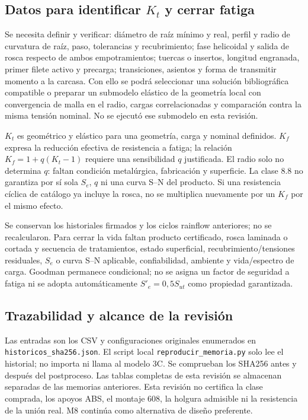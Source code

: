 \subsection{Datos para identificar $K_t$ y cerrar fatiga}
Se necesita definir y verificar: diámetro de raíz mínimo y real, perfil
y radio de curvatura de raíz, paso, tolerancias y recubrimiento; fase
helicoidal y salida de rosca respecto de ambos empotramientos; tuercas o
insertos, longitud engranada, primer filete activo y precarga; transiciones,
asientos y forma de transmitir momento a la carcasa. Con ello se podrá
seleccionar una solución bibliográfica compatible o preparar un submodelo
elástico de la geometría local con convergencia de malla en el radio,
cargas correlacionadas y comparación contra la misma tensión nominal.
No se ejecutó ese submodelo en esta revisión.

$K_t$ es geométrico y elástico para una geometría, carga y nominal
definidos. $K_f$ expresa la reducción efectiva de resistencia a fatiga;
la relación $K_f=1+q(K_t-1)$ requiere una sensibilidad $q$ justificada.
El radio solo no determina $q$: faltan condición metalúrgica, fabricación
y superficie. La clase 8.8 no garantiza por sí sola $S_e$, $q$ ni una
curva S--N del producto. Si una resistencia cíclica de catálogo ya incluye
la rosca, no se multiplica nuevamente por un $K_f$ por el mismo efecto.

Se conservan los historiales firmados y los ciclos rainflow anteriores;
no se recalcularon. Para cerrar la vida faltan producto certificado,
rosca laminada o cortada y secuencia de tratamientos, estado superficial,
recubrimiento/tensiones residuales, $S_e$ o curva S--N aplicable,
confiabilidad, ambiente y vida/espectro de carga. Goodman permanece
condicional; no se asigna un factor de seguridad a fatiga ni se adopta
automáticamente $S'_e=0,5S_{ut}$ como propiedad garantizada.

\subsection{Trazabilidad y alcance de la revisión}
Las entradas son los CSV y configuraciones originales enumerados en
\texttt{historicos\_sha256.json}. El script local
\texttt{reproducir\_memoria.py} solo lee el historial; no importa ni llama
al modelo 3C. Se comprueban los SHA256 antes y después del postproceso.
Las tablas completas de esta revisión se almacenan separadas de las
memorias anteriores. Esta revisión no certifica la clase comprada,
los apoyos ABS, el montaje 608, la holgura admisible ni la resistencia
de la unión real. M8 continúa como alternativa de diseño preferente.

